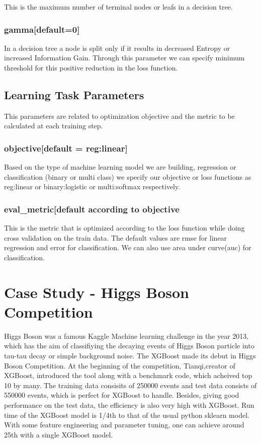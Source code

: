 This is the maximum number of terminal nodes or leafs in a decision tree.

\subsubsection{gamma[default=0]} 

In a decision tree a node is split only if it results in decreased Entropy or increased 
Information Gain. Through this parameter  we can specify minimum threshold for this positive 
reduction in the loss function.

\subsection{Learning Task Parameters} 

This parameters are related to optimization objective and the metric to be calculated at
each training step.

\subsubsection{objective[default = reg:linear]}

Based on the type of machine learning model we are building, regression or classification
(binary or multi class) we specify our objective or loss functions as reg:linear or
binary:logistic or  multi:softmax respectively.

\subsubsection{eval\_metric[default according to objective}

This is the metric that is optimized according to the loss function while doing cross 
validation on the train data. The default values are rmse for linear regression and  error 
for classification. We can also use area under curve(auc) for classification.

\section{Case Study - Higgs Boson Competition}

Higgs Boson was a famous Kaggle Machine learning challenge in the year 2013, which has the 
aim of classifiying the decaying events of Higgs Boson particle into tau-tau decay or simple 
background noise. The XGBoost made its debut in Higgs Boson Competition. At the beginning of 
the competition, Tianqi,creator of XGBoost, introduced the tool along with a benchmark code, 
which acheived top 10%
by many.
The training data consisits of 250000 events and test data consists of 550000 events, which is
perfect for XGBoost to handle. Besides, giving good performance on the test data, the efficiency
is also very high with XGBoost. Run time of the XGBoost model is 1/4th to that of the usual
python sklearn model. With some feature engineering and parameter tuning, one can achieve around
25th with a single XGBoost model.

